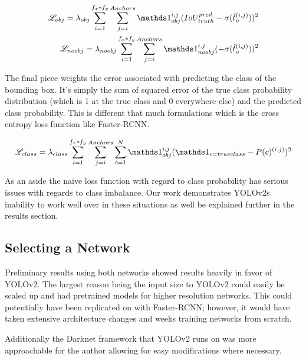 \begin{align}
    \Loss_{obj} = \lambda_{obj} \sum_{i=1}^{f_x*f_y} \sum_{j=i}^{Anchors} \indicator_{obj}^{i,j} (IoU_{truth}^{pred} - \sigma(\hat{t}_o^{(i,j)}))^2 \\
    \Loss_{noobj} = \lambda_{noobj} \sum_{i=1}^{f_x*f_y} \sum_{j=i}^{Anchors} \indicator_{noobj}^{i,j} (-\sigma(\hat{t}_o^{(i,j)}))^2 \\
\end{align}

The final piece weights the error associated with predicting the class of the bounding box. It's simply the sum of squared error of the true class probability distribution (which is 1 at the true class and 0 everywhere else) and the predicted class probability. This is different that much formulations which is the cross entropy loss function like Faster-RCNN.

\begin{align}
    \Loss_{class} = \lambda_{class}\sum_{i=1}^{f_x*f_y} \sum_{j=i}^{Anchors} \sum_{c=1}^{N} \indicator_{obj}^{i,j} (\indicator_{c=true class}-P(c)^{(i,j)})^2
\end{align}

As an aside the naive loss function with regard to class probability has serious issues with regards to class imbalance. Our work demonstrates YOLOv2s inability to work well over in these situations as well be explained further in the results section.

\subsection{Selecting a Network}

Preliminary results using both networks showed results heavily in favor of YOLOv2. The largest reason being the input size to YOLOv2 could easily be scaled up and had pretrained models for higher resolution networks. This could potentially have been replicated on with Faster-RCNN; however, it would have taken extensive architecture changes and weeks training networks from scratch.

Additionally the Darknet framework that YOLOv2 runs on was more approachable for the author allowing for easy modifications where necessary.
